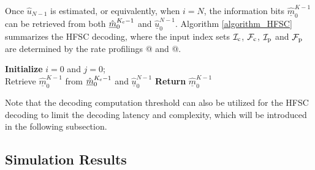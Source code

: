 \documentclass[12pt, draftclsnofoot, peerreview, onecolumn]{IEEEtran}
\makeatletter
\theoremstyle{noparent}
\newcommand{\Rmnum}[1]{\expandafter\@slowromancap\romannumeral #1@}
\makeatother
\begin{document}
Once $\hat{u}_{N-1}$ is estimated, 
or equivalently, when $i=N$, 
the information bits $\underline{\hat{m}}_{0}^{K-1}$ 
can be retrieved from both $\underline{\hat{m}}_{0}^{K_{\rm c}-1}$ 
and $\underline{\hat{u}}_{0}^{N-1}$.
Algorithm \ref{algorithm_HFSC} summarizes the HFSC decoding,
where the input index sets $\mathcal{I}_{\rm c}$, $\mathcal{F}_{\rm c}$, $\mathcal{I}_{\rm p}$ and $\mathcal{F}_{\rm p}$ are determined by the rate profilings \Rmnum{1} and \Rmnum{2}.



\begin{algorithm}[t]
    \label{algorithm_HFSC}
    \caption{The HFSC Decoding}
    {\bf Initialize} $i=0$ and $j=0$;\\
    Retrieve $\underline{\hat{m}}_{0}^{K-1}$ from $\underline{\hat{m}}_{0}^{K_{\rm c}-1}$ and $\underline{\hat{u}}_{0}^{N-1}$\;
    {\bf Return } $\underline{\hat{m}}_{0}^{K-1}$
\end{algorithm}
Note that the decoding computation threshold can also be utilized 
for the HFSC decoding to limit the decoding latency and complexity, 
which will be introduced in the following subsection.


\subsection{Simulation Results}
\label{optimize_HFSC_performance}
\end{document}

